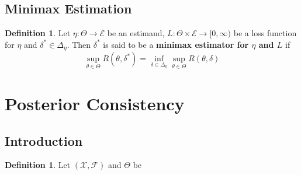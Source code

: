 \documentclass[12pt]{amsart}
\theoremstyle{definition}
\newtheorem{defn}[definition]{Definition}
\newcommand{\del}{\delta}
\newcommand{\Del}{\Delta}
\newcommand{\MF}{\mathcal{F}}
\newcommand{\ME}{\mathcal{E}}
\newcommand{\MX}{\mathcal{X}}
\newcommand{\Rg}{[0,\infty)}
\begin{document}
	
	
	
	
	
	
	
	
	
	
	
	
	
	
	
	
	
	
	
	
	
	
	
	
	
	
	
	
	
	
	
	
	
	
	
	
	
	
	
	
	
	
	
	\newpage
	\subsection{Minimax Estimation}
	
	\begin{defn}
		Let $\eta: \Theta \rightarrow \ME$ be an estimand, $L: \Theta \times \ME \rightarrow \Rg$ be a loss function for $\eta$ and $\del^* \in \Del_{\eta}$. Then $\del^*$ is said to be a \textbf{minimax estimator for $\eta$ and $L$} if 
		$$\sup_{\theta \in \Theta}R(\theta, \del^*) = \inf_{\del \in \Del_{\eta}} \sup_{\theta \in \Theta}R(\theta, \del)  $$
	\end{defn}
	
	
	
	
	
	
	
	
	
	
	
	
	
	
	
	
	
	
	
	
	
	
	
	
	
	
	\newpage
	\section{Posterior Consistency}
	
	\subsection{Introduction}
	
	\begin{defn}
	Let $(\MX, \MF)$ and $\Theta$ be
	\end{defn}	
	

	
\end{document}
